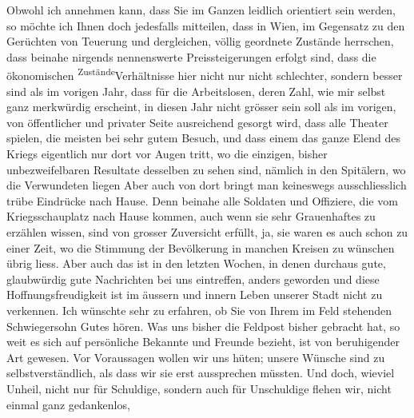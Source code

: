 \begin{ledgroupsized}[t]{13cm}
               Obwohl ich annehmen kann, dass Sie im Ganzen \label{LL710-1v}\label{LL710-1h}leidlich orientiert sein werden, so möchte ich Ihnen doch jedesfalls mitteilen,
               dass in Wien, im Gegensatz zu den Gerüchten von
               Teuerung und dergleichen, völlig geordnete Zustände herrschen, dass beinahe nirgends
               nennenswerte Preissteigerungen erfolgt sind, dass die ökonomischen \substVorne{}\textsuperscript{Zustände}{\allowbreak}\substDazwischen{}Verhältnisse\substHinten{} hier nicht nur nicht schlechter, sondern besser sind als im vorigen Jahr,
               dass für die Arbeitslosen, deren Zahl, wie mir selbst ganz merkwürdig erscheint, in
               diesen Jahr nicht grösser sein soll als im vorigen, von öffentlicher und privater
               Seite ausreichend {\pb}gesorgt wird, dass alle Theater
               spielen, die meisten bei sehr gutem Besuch, und dass einem das ganze Elend des Kriegs
               eigentlich nur dort vor Augen tritt, wo die einzigen, bisher unbezweifelbaren
               Resultate desselben zu sehen sind, nämlich in den Spitälern, wo die Verwundeten
                  liegen{\dotstwo} Aber auch von dort bringt man keineswegs
               ausschliesslich trübe Eindrücke nach Hause. Denn beinahe alle Soldaten und Offiziere,
               die vom Kriegsschauplatz nach Hause kommen, auch wenn sie sehr Grauenhaftes zu
               erzählen wissen, sind von grosser Zuversicht erfüllt, ja, sie waren es auch schon zu
               einer Zeit, wo die Stimmung der Bevölkerung in manchen Kreisen zu wünschen übrig
               liess. Aber auch das ist in den letzten Wochen, in denen durchaus gute, glaubwürdig
               gute Nachrichten bei uns eintreffen, anders geworden und diese Hoffnungsfreudigkeit
               ist im äussern und innern Leben unserer Stadt nicht zu verkennen.\pend
           \pstart
           Ich wünschte sehr zu erfahren, ob {\pb}Sie von Ihrem
               im Feld stehenden Schwiegersohn Gutes hören. Was uns bisher die Feldpost bisher
               gebracht hat, so weit es sich auf persönliche Bekannte und Freunde bezieht, ist von
               beruhigender Art gewesen.\pend
           \pstart
           Vor Voraussagen wollen wir uns hüten; unsere Wünsche sind zu selbstverständlich, als
               dass wir sie erst aussprechen müssten. Und doch, wieviel Unheil, nicht nur für
               Schuldige, sondern auch für Unschuldige flehen wir, nicht einmal ganz gedankenlos,

\end{ledgroupsized}
